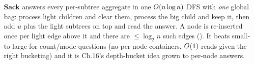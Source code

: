 \begin{recallbox}
\textbf{Sack} answers every per-subtree aggregate in one \(O(n\log n)\) DFS
with \emph{one} global bag: process light children and clear them, process the
big child and keep it, then add \(u\) plus the light subtrees on top and read
the answer.  A node is re-inserted once per light edge above it and there are
\(\le\log_2 n\) such edges ().  It beats small-to-large for
count/mode questions (no per-node containers, \(O(1)\) reads given the right
bucketing) and it is Ch.16's depth-bucket idea grown to per-node answers.
\end{recallbox}
